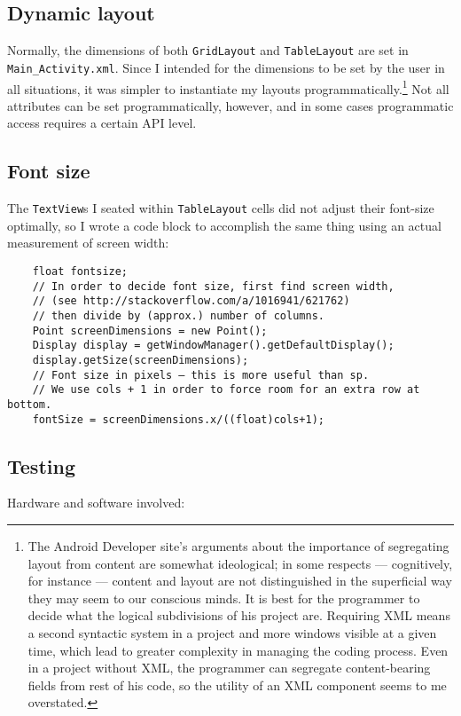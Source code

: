 \documentclass[11pt,asymmetric]{article}
\begin{document}
\subsection{Dynamic layout}
Normally, the dimensions of both \texttt{GridLayout} and \texttt{TableLayout} are set in \texttt{Main\_Activity.xml}. Since I intended for the dimensions to be set by the user in all situations, it was simpler to instantiate my layouts programmatically.\footnote{The Android Developer site's arguments about the importance of segregating layout from content are somewhat ideological; in some respects --- cognitively, for instance --- content and layout are not distinguished in the superficial way they may seem to our conscious minds. It is best for the programmer to decide what the logical subdivisions of his project are. Requiring XML means a second syntactic system in a project and more windows visible at a given time, which lead to greater complexity in managing the coding process. Even in a project without XML, the programmer can segregate content-bearing fields from rest of his code, so the utility of an XML component seems to me overstated.} Not all attributes can be set programmatically, however, and in some cases programmatic access requires a certain API level. 

\subsection{Font size}
The \texttt{TextView}s I seated within \texttt{TableLayout} cells did not adjust their font-size optimally, so I wrote a code block to accomplish the same thing using an actual measurement of screen width:

\begin{lstlisting}
    float fontsize;
    // In order to decide font size, first find screen width, 
    // (see http://stackoverflow.com/a/1016941/621762)
    // then divide by (approx.) number of columns.
    Point screenDimensions = new Point();
    Display display = getWindowManager().getDefaultDisplay();
    display.getSize(screenDimensions);
    // Font size in pixels — this is more useful than sp.
    // We use cols + 1 in order to force room for an extra row at bottom.
    fontSize = screenDimensions.x/((float)cols+1);
\end{lstlisting}

\subsection{Testing}
Hardware and software involved:
\end{document}
